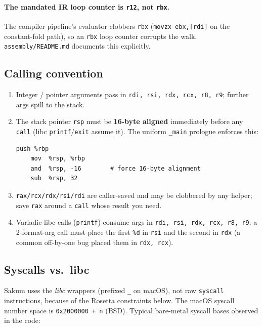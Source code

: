 \paragraph{The mandated IR loop counter is \texttt{r12}, not \texttt{rbx}.}
The compiler pipeline's evaluator clobbers \texttt{rbx}
(\texttt{movzx ebx,[rdi]} on the constant-fold path), so an \texttt{rbx}
loop counter corrupts the walk.  \texttt{assembly/README.md} documents this
explicitly.

\subsection{Calling convention}

\begin{enumerate}
  \item Integer / pointer arguments pass in \texttt{rdi, rsi, rdx, rcx, r8,
    r9}; further args spill to the stack.
  \item The stack pointer \texttt{rsp} must be \textbf{16-byte aligned}
    immediately before any \texttt{call} (libc \texttt{printf}/\texttt{exit}
    assume it).  The uniform \texttt{\_main} prologue enforces this:
\begin{lstlisting}[language=SakumAsm,caption={\_main prologue (sakum\_simd.s:10, sakum\_ai.s:74).}]
    push %rbp
    mov  %rsp, %rbp
    and  %rsp, -16        # force 16-byte alignment
    sub  %rsp, 32
\end{lstlisting}
  \item \texttt{rax/rcx/rdx/rsi/rdi} are caller-saved and may be clobbered
    by any helper; save \texttt{rax} around a \texttt{call} whose result
    you need.
  \item Variadic libc calls (\texttt{printf}) consume args in
    \texttt{rdi, rsi, rdx, rcx, r8, r9}; a 2-format-arg call must place the
    first \texttt{\%d} in \texttt{rsi} and the second in \texttt{rdx}
    (a common off-by-one bug placed them in \texttt{rdx, rcx}).
\end{enumerate}

\subsection{Syscalls vs.\ libc}

Sakum uses the \emph{libc} wrappers (prefixed \texttt{\_} on macOS), not
raw \texttt{syscall} instructions, because of the Rosetta constraints below.
The macOS syscall number space is \texttt{0x2000000 + n} (BSD).
Typical bare-metal syscall bases observed in the code:

